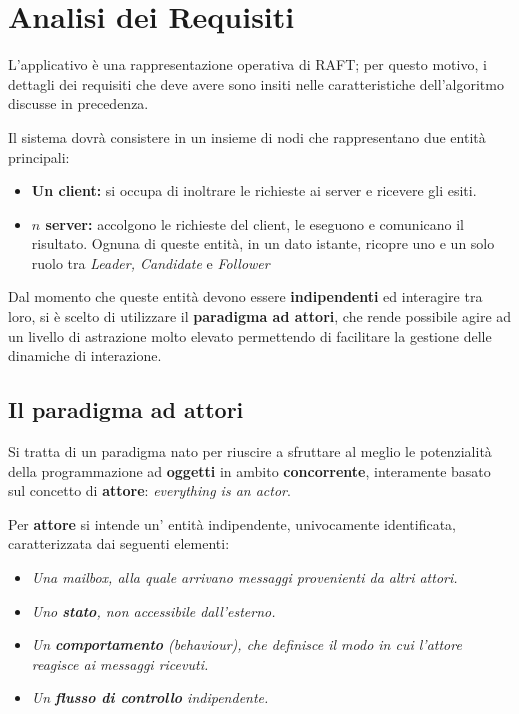 \section{Analisi dei Requisiti}
L'applicativo è una rappresentazione operativa di RAFT; per questo motivo, i dettagli dei requisiti che deve avere sono insiti nelle caratteristiche dell'algoritmo discusse in precedenza. 

Il sistema dovrà consistere in un insieme di nodi che rappresentano due entità principali:
	\begin{itemize}
		\item \textbf{Un client:} si occupa di inoltrare le richieste ai server e ricevere gli esiti.
		\item \textbf{$n$ server:} accolgono le richieste del client, le eseguono e comunicano il risultato. Ognuna di queste entità, in un dato istante, ricopre uno e un solo ruolo tra \textit{Leader, Candidate} e \textit{Follower}
	\end{itemize}

Dal momento che queste entità devono essere \textbf{indipendenti} ed interagire tra loro, si è scelto di utilizzare il \textbf{paradigma ad attori}, che rende possibile agire ad un livello di astrazione molto elevato permettendo di facilitare la gestione delle dinamiche di interazione.


	\subsection{Il paradigma ad attori} \label{Actors}
	Si tratta di un paradigma nato per riuscire a sfruttare al meglio le potenzialità della programmazione ad \textbf{oggetti} in ambito \textbf{concorrente}, interamente basato sul concetto di \textbf{attore}: \emph{everything is an actor}.

	Per \textbf{attore} si intende un' entità indipendente, univocamente identificata, caratterizzata dai seguenti elementi:
	\begin{itemize}
		\item \emph{Una mailbox, alla quale arrivano messaggi provenienti da altri attori.}
		\item \emph{Uno \textbf{stato}, non accessibile dall'esterno.}
		\item \emph{Un \textbf{comportamento} (behaviour), che definisce il modo in cui l'attore reagisce ai messaggi ricevuti.}
		\item \emph{Un \textbf{flusso di controllo} indipendente.}
	\end{itemize}

